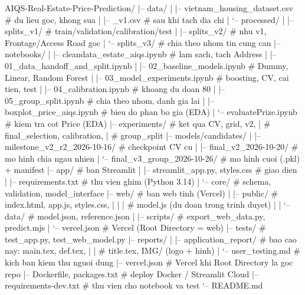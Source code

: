\documentclass[11pt]{article}
\begin{document}
\begin{codebox}[title={Cấu trúc thư mục repo}, breakable]
AIQS-Real-Estate-Price-Prediction/
|-- data/
|   |-- vietnam_housing_dataset.csv   # du lieu goc, khong sua
|   |-- _v1.csv                        # sau khi tach dia chi
|   `-- processed/
|       |-- splits_v1/                 # train/validation/calibration/test
|       |-- splits_v2/                 # nhu v1, Frontage/Access Road goc
|       `-- splits_v3/                 # chia theo nhom tin cung can
|-- notebooks/
|   |-- cleandata_estate_aiqs.ipynb    # lam sach, tach Address
|   |-- 01_data_handoff_and_split.ipynb
|   |-- 02_baseline_models.ipynb       # Dummy, Linear, Random Forest
|   |-- 03_model_experiments.ipynb     # boosting, CV, cai tien, test
|   |-- 04_calibration.ipynb           # khoang du doan 80%
|   |-- 05_group_split.ipynb           # chia theo nhom, danh gia lai
|   |-- boxplot_price_aiqs.ipynb       # bieu do phan bo gia (EDA)
|   `-- evaluatePrize.ipynb            # kiem tra cot Price (EDA)
|-- experiments/                       # ket qua CV, grid, v2,
|                                      #   final_selection, calibration,
|                                      #   group_split
|-- models/candidates/
|   |-- milestone_v2_r2_2026-10-16/    # checkpoint CV cu
|   |-- final_v2_2026-10-20/           # mo hinh chia ngau nhien
|   `-- final_v3_group_2026-10-26/     # mo hinh cuoi (.pkl) + manifest
|-- app/                               # ban Streamlit
|   |-- streamlit_app.py, styles.css   # giao dien
|   |-- requirements.txt               # thu vien ghim (Python 3.14)
|   `-- core/                          # schema, validation, model_interface
|-- web/                               # ban web tinh (Vercel)
|   |-- public/                        # index.html, app.js, styles.css,
|   |   |                              #   model.js (du doan trong trinh duyet)
|   |   `-- data/                      # model.json, reference.json
|   |-- scripts/                       # export_web_data.py, predict.mjs
|   `-- vercel.json                    # Vercel (Root Directory = web)
|-- tests/                             # test_app.py, test_web_model.py
|-- reports/
|   |-- application_report/            # bao cao nay: main.tex, def.tex,
|   |                                  #   title.tex, IMG/ (logo + hinh)
|   `-- user_testing.md                # kich ban kiem thu nguoi dung
|-- vercel.json                        # Vercel khi Root Directory la goc repo
|-- Dockerfile, packages.txt           # deploy Docker / Streamlit Cloud
|-- requirements-dev.txt               # thu vien cho notebook va test
`-- README.md
\end{codebox}
\end{document}
